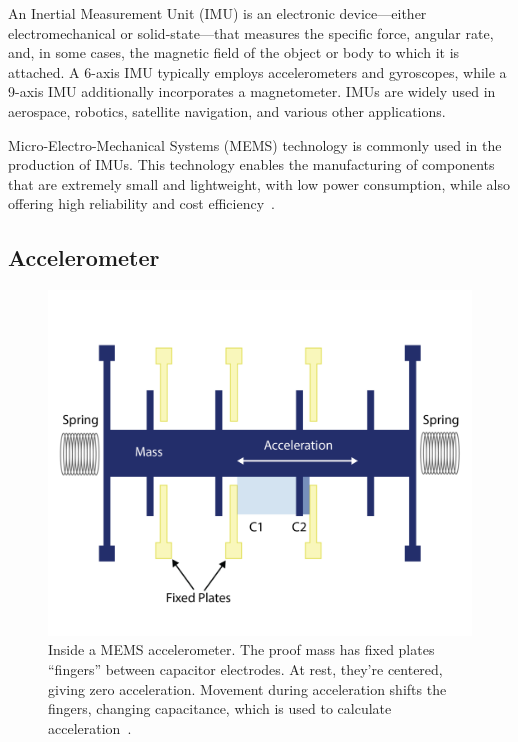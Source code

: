 \documentclass[english, bachelor, utf8]{base/thesis_telematics}
\begin{document}
An Inertial Measurement Unit (IMU) is an electronic device—either electromechanical or solid-state—that measures the specific force, angular rate, and, in some cases, the magnetic field of the object or body to which it is attached.
A 6-axis IMU typically employs accelerometers and gyroscopes, while a 9-axis IMU additionally incorporates a magnetometer. IMUs are widely used in aerospace, robotics, satellite navigation, and various other applications.

Micro-Electro-Mechanical Systems (MEMS) technology is commonly used in the production of IMUs. This technology enables the manufacturing of components that are extremely small and lightweight, with low power consumption, while also offering high reliability and cost efficiency~\cite{advnav_imu_intro,stanford_gps_lab_imu_testing}.
\subsection{Accelerometer}

\begin{figure}[ht]
\centering
\includegraphics[width=\columnwidth]{pics/accel_inside.png}
\caption{Inside a MEMS accelerometer. The proof mass has fixed plates “fingers” between capacitor electrodes. At rest, they’re centered, giving zero acceleration. Movement during acceleration shifts the fingers, changing capacitance, which is used to calculate acceleration~\cite{ericco_mems_accel_vibrations}.}
\label{fig:inside_accel}
\end{figure}
\end{document}
